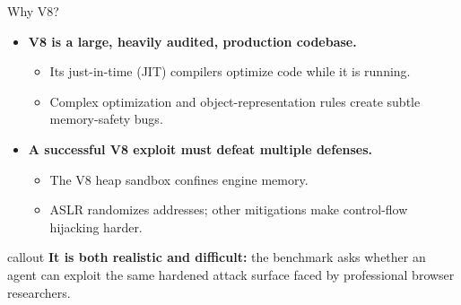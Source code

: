 \documentclass[aspectratio=169,t]{beamer}
\newcommand{\callout}[1]{%
  \vspace{0.45em}%
  \begin{beamercolorbox}[wd=\linewidth,sep=0.55em,rounded=false]{callout}
    #1
  \end{beamercolorbox}%
  \vspace{0.35em}%
}
\begin{document}
\begin{frame}{Why V8?}
  \begin{itemize}
    \item \textbf{V8 is a large, heavily audited, production codebase.}
      \begin{itemize}
        \item Its just-in-time (JIT) compilers optimize code while it is running.
        \item Complex optimization and object-representation rules create subtle memory-safety bugs.
      \end{itemize}
    \item \textbf{A successful V8 exploit must defeat multiple defenses.}
      \begin{itemize}
        \item The V8 heap sandbox confines engine memory.
        \item ASLR randomizes addresses; other mitigations make control-flow hijacking harder.
      \end{itemize}
  \end{itemize}
  \vfill
  \callout{\textbf{It is both realistic and difficult:} the benchmark asks whether an agent can exploit the same hardened attack surface faced by professional browser researchers.}
\end{frame}
\end{document}
